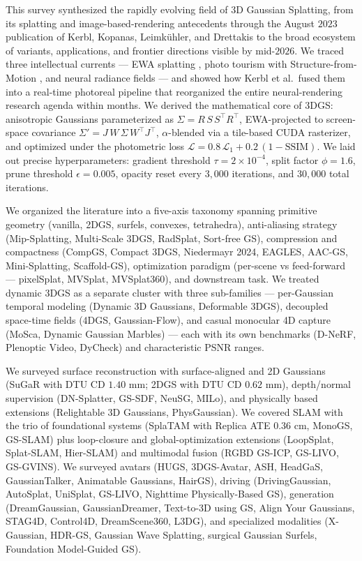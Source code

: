 \documentclass{article}
\begin{document}
This survey synthesized the rapidly evolving field of 3D Gaussian Splatting, from its splatting and image-based-rendering antecedents through the August \(2023\) publication of Kerbl, Kopanas, Leimkühler, and Drettakis to the broad ecosystem of variants, applications, and frontier directions visible by mid-\(2026\). We traced three intellectual currents --- EWA splatting \cite{zwicker2002ewasplatting}, photo tourism with Structure-from-Motion \cite{schnberger2016structurefrommotio}, and neural radiance fields \cite{mildenhall2020nerfrepresentingsc} --- and showed how Kerbl et al.~fused them into a real-time photoreal pipeline that reorganized the entire neural-rendering research agenda within months. We derived the mathematical core of 3DGS: anisotropic Gaussians parameterized as \(\Sigma=R\,S\,S^{\top}R^{\top}\), EWA-projected to screen-space covariance \(\Sigma'=J\,W\,\Sigma\,W^{\top}J^{\top}\), \(\alpha\)-blended via a tile-based CUDA rasterizer, and optimized under the photometric loss \(\mathcal{L}=0.8\,\mathcal{L}_1 + 0.2\,(1-\mathrm{SSIM})\). We laid out precise hyperparameters: gradient threshold \(\tau=2{\times}10^{-4}\), split factor \(\phi=1.6\), prune threshold \(\epsilon=0.005\), opacity reset every \(3{,}000\) iterations, and \(30{,}000\) total iterations.

We organized the literature into a five-axis taxonomy spanning primitive geometry (vanilla, 2DGS, surfels, convexes, tetrahedra), anti-aliasing strategy (Mip-Splatting, Multi-Scale 3DGS, RadSplat, Sort-free GS), compression and compactness (CompGS, Compact 3DGS, Niedermayr 2024, EAGLES, AAC-GS, Mini-Splatting, Scaffold-GS), optimization paradigm (per-scene vs feed-forward --- pixelSplat, MVSplat, MVSplat360), and downstream task. We treated dynamic 3DGS as a separate cluster with three sub-families --- per-Gaussian temporal modeling (Dynamic 3D Gaussians, Deformable 3DGS), decoupled space-time fields (4DGS, Gaussian-Flow), and casual monocular 4D capture (MoSca, Dynamic Gaussian Marbles) --- each with its own benchmarks (D-NeRF, Plenoptic Video, DyCheck) and characteristic PSNR ranges.

We surveyed surface reconstruction with surface-aligned and 2D Gaussians (SuGaR with DTU CD \(1.40\) mm; 2DGS with DTU CD \(0.62\) mm), depth/normal supervision (DN-Splatter, GS-SDF, NeuSG, MILo), and physically based extensions (Relightable 3D Gaussians, PhysGaussian). We covered SLAM with the trio of foundational systems (SplaTAM with Replica ATE \(0.36\) cm, MonoGS, GS-SLAM) plus loop-closure and global-optimization extensions (LoopSplat, Splat-SLAM, Hier-SLAM) and multimodal fusion (RGBD GS-ICP, GS-LIVO, GS-GVINS). We surveyed avatars (HUGS, 3DGS-Avatar, ASH, HeadGaS, GaussianTalker, Animatable Gaussians, HairGS), driving (DrivingGaussian, AutoSplat, UniSplat, GS-LIVO, Nighttime Physically-Based GS), generation (DreamGaussian, GaussianDreamer, Text-to-3D using GS, Align Your Gaussians, STAG4D, Control4D, DreamScene360, L3DG), and specialized modalities (X-Gaussian, HDR-GS, Gaussian Wave Splatting, surgical Gaussian Surfels, Foundation Model-Guided GS).
\end{document}
